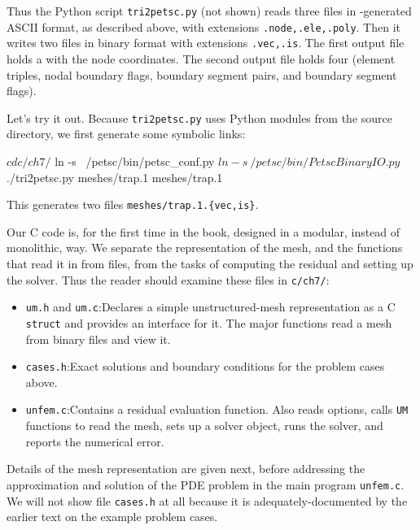 Thus the Python script \texttt{tri2petsc.py} (not shown) reads three files in \Triangle-generated ASCII format, as described above, with extensions \texttt{.node,.ele,.poly}.  Then it writes two files in \PETSc binary format with extensions \texttt{.vec,.is}.  The first output file holds a \pVec with the node coordinates.  The second output file holds four \pISs (element triples, nodal boundary flags, boundary segment pairs, and boundary segment flags).

Let's try it out.  Because \texttt{tri2petsc.py} uses Python modules from the \PETSc source directory, we first generate some symbolic links:
\begin{cline}
$ cd c/ch7/
$ ln -s ~/petsc/bin/petsc_conf.py
$ ln -s ~/petsc/bin/PetscBinaryIO.py
$ ./tri2petsc.py meshes/trap.1 meshes/trap.1
\end{cline}
This generates two files \texttt{meshes/trap.1.\{vec,is\}}.


Our C code is, for the first time in the book, designed in a modular, instead of monolithic, way.  We separate the representation of the mesh, and the functions that read it in from files, from the tasks of computing the residual and setting up the \PETSc solver.  Thus the reader should examine these files in \texttt{c/ch7/}:
\begin{itemize}
\item \texttt{um.h} and \texttt{um.c}:\quad  Declares a simple unstructured-mesh representation as a C \texttt{struct} and provides an interface for it.  The major functions read a mesh from binary files and view it.
\item \texttt{cases.h}:\quad  Exact solutions and boundary conditions for the problem cases above.
\item \texttt{unfem.c}:\quad  Contains a residual evaluation function.  Also reads options, calls \texttt{UM} functions to read the mesh, sets up a \pSNES solver object, runs the solver, and reports the numerical error.
\end{itemize}

Details of the mesh representation are given next, before addressing the approximation and solution of the PDE problem in the main program \texttt{unfem.c}.  We will not show file \texttt{cases.h} at all because it is adequately-documented by the earlier text on the example problem cases.

